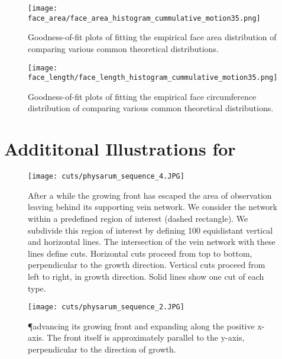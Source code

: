 \begin{figure}[!htbp]
\begin{center}%
  \texttt{[image: face\_area/face\_area\_histogram\_cummulative\_motion35.png]}
\end{center}%
\caption[Goodness-of-fit plots - Face area]{Goodness-of-fit plots of fitting the empirical face area distribution of  comparing various common theoretical distributions.}
\label{fig:sup::face_area_goodness}
\end{figure}

\begin{figure}[!htbp]
\begin{center}%
  \texttt{[image: face\_length/face\_length\_histogram\_cummulative\_motion35.png]}
\end{center}%
\caption[Goodness-of-fit plots - Face circumference]{Goodness-of-fit plots of fitting the empirical face circumference distribution of  comparing various common theoretical distributions.}
\label{fig:sup::face_length_goodness}
\end{figure}

\section{Addititonal Illustrations for }

\vfill
\begin{figure}[!htbp]
\begin{center}%
  \texttt{[image: cuts/physarum\_sequence\_4.JPG]}
\end{center}%
\caption[Horizontal and vertical cuts illustrated]{After a while the growing front has escaped the area of observation leaving behind its supporting vein network. We consider the network within a predefined region of interest (dashed rectangle). We subdivide this region of interest by defining 100 equidistant vertical and horizontal lines. The intersection of the vein network with these lines define cuts. Horizontal cuts proceed from top to bottom, \ie perpendicular to the growth direction. Vertical cuts proceed from left to right, \ie in growth direction. Solid lines show one cut of each type.}
\label{fig:sup::physarum_roi}
\end{figure}
\vfill
\begin{figure}[!htbp]
\begin{center}%
  \texttt{[image: cuts/physarum\_sequence\_2.JPG]}
\end{center}%
\caption[Detail of the apical zone]{\P advancing its growing front and expanding along the positive x-axis. The front itself is approximately parallel to the y-axis, \ie perpendicular to the direction of growth.}
\label{fig:sup::physarum_expanding}
\end{figure}
\vfill


